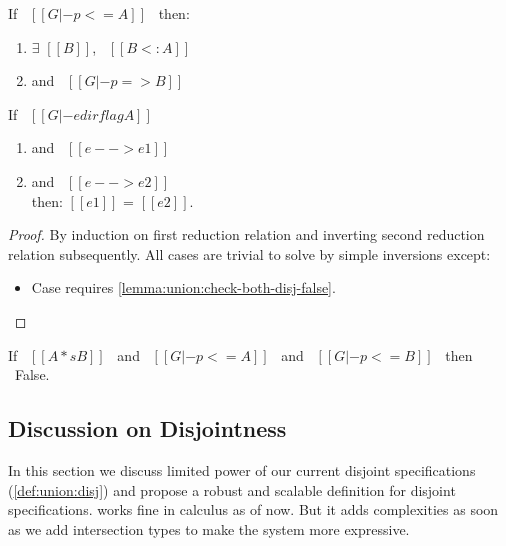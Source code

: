 \begin{lemma}
\label{lemma:union:pexpr-inf-typ}
If \ $[[G |- p <= A]]$ \ then:
  \begin{enumerate}
  \item $\exists$ $[[B]]$, \ $[[B <: A]]$
  \item and \ $[[G |- p => B]]$
  \end{enumerate}
\end{lemma}

\begin{lemma}[Determinism]
\label{lemma:union:determinism}
  If \ $[[G |- e dirflag A]]$
  \begin{enumerate}
  \item and \ $[[e --> e1]]$
  \item and \ $[[e --> e2]]$ \\
  then: $[[e1]]$ = $[[e2]]$.
  \end{enumerate}
\end{lemma}

\begin{proof}
  By induction on first reduction relation and inverting second reduction relation subsequently.
  All cases are trivial to solve by simple inversions except:
  \begin{itemize}
    \item Case  requires \cref{lemma:union:check-both-disj-false}.
  \end{itemize}
\end{proof}

\begin{lemma}
\label{lemma:union:check-both-disj-false}
If \ $[[A *s B]]$ \ and \ $[[G |- p <= A]]$ \ and \ $[[G |- p <= B]]$ \ then \ False.
\end{lemma}


\subsection{Discussion on Disjointness}
\label{sec:union:discussion}
In this section we discuss limited power of our current disjoint specifications 
(\cref{def:union:disj}) and propose a robust and scalable definition for disjoint specifications.
 works fine in calculus as of now. But it adds complexities as soon as we add
intersection types to make the system more expressive.